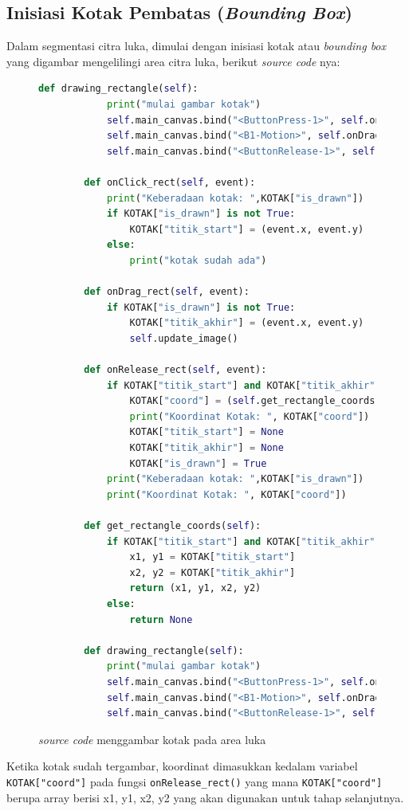 \subsection{Inisiasi Kotak Pembatas (\emph{Bounding Box})}

Dalam segmentasi citra luka, dimulai dengan inisiasi kotak atau \emph{bounding box} 
yang digambar mengelilingi area citra luka, berikut \emph{source code} nya:
\begin{figure}[H]
	\begin{lstlisting}[language=Python, basicstyle=\tiny]
		def drawing_rectangle(self):
			print("mulai gambar kotak")
			self.main_canvas.bind("<ButtonPress-1>", self.onClick_rect)
			self.main_canvas.bind("<B1-Motion>", self.onDrag_rect)
			self.main_canvas.bind("<ButtonRelease-1>", self.onRelease_rect)

		def onClick_rect(self, event):
			print("Keberadaan kotak: ",KOTAK["is_drawn"])
			if KOTAK["is_drawn"] is not True:
				KOTAK["titik_start"] = (event.x, event.y)
			else:
				print("kotak sudah ada")

		def onDrag_rect(self, event):
			if KOTAK["is_drawn"] is not True:
				KOTAK["titik_akhir"] = (event.x, event.y)
				self.update_image()

		def onRelease_rect(self, event):
			if KOTAK["titik_start"] and KOTAK["titik_akhir"]:
				KOTAK["coord"] = (self.get_rectangle_coords())
				print("Koordinat Kotak: ", KOTAK["coord"])
				KOTAK["titik_start"] = None
				KOTAK["titik_akhir"] = None
				KOTAK["is_drawn"] = True
			print("Keberadaan kotak: ",KOTAK["is_drawn"])
			print("Koordinat Kotak: ", KOTAK["coord"])

		def get_rectangle_coords(self):
			if KOTAK["titik_start"] and KOTAK["titik_akhir"]:
				x1, y1 = KOTAK["titik_start"]
				x2, y2 = KOTAK["titik_akhir"]
				return (x1, y1, x2, y2)
			else:
				return None

		def drawing_rectangle(self):
			print("mulai gambar kotak")
			self.main_canvas.bind("<ButtonPress-1>", self.onClick_rect)
			self.main_canvas.bind("<B1-Motion>", self.onDrag_rect)
			self.main_canvas.bind("<ButtonRelease-1>", self.onRelease_rect)

	\end{lstlisting}
	\caption{\emph{source code} menggambar kotak pada area luka}
	\label{code:inisiasi_rectangle}
\end{figure}

Ketika kotak sudah tergambar, koordinat dimasukkan kedalam variabel \texttt{KOTAK["coord"]}
pada fungsi \texttt{onRelease\_rect()} yang mana \texttt{KOTAK["coord"]} berupa array 
berisi x1, y1, x2, y2 yang akan digunakan untuk tahap selanjutnya.

